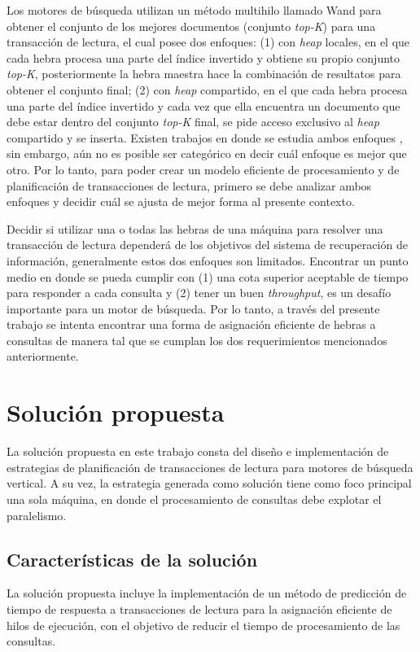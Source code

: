 Los motores de búsqueda utilizan un método multihilo llamado Wand para obtener el conjunto de los mejores documentos (conjunto \textit{top-K}) para una transacción de lectura, el cual posee dos enfoques: (1) con \textit{heap} locales, en el que cada hebra procesa una parte del índice invertido y obtiene su propio conjunto \textit{top-K}, posteriormente la hebra maestra hace la combinación de resultatos para obtener el conjunto final; (2) con \textit{heap} compartido, en el que cada hebra procesa una parte del índice invertido y cada vez que ella encuentra un documento que debe estar dentro del conjunto \textit{top-K} final, se pide acceso exclusivo al \textit{heap} compartido y se inserta. Existen trabajos en donde se estudia ambos enfoques \citep{Rojas:2013}, sin embargo, aún no es posible ser categórico en decir cuál enfoque es mejor que otro. Por lo tanto, para poder crear un modelo eficiente de procesamiento y de planificación de transacciones de lectura, primero se debe analizar ambos enfoques y decidir cuál se ajusta de mejor forma al presente contexto.

Decidir si utilizar una o todas las hebras de una máquina para resolver una transacción de lectura dependerá de los objetivos del sistema de recuperación de información, generalmente estos dos enfoques son limitados. Encontrar un punto medio en donde se pueda cumplir con (1) una cota superior aceptable de tiempo para responder a cada consulta y (2) tener un buen \textit{throughput}, es un desafío importante para un motor de búsqueda. Por lo tanto, a través del presente trabajo se intenta encontrar una forma de asignación eficiente de hebras a consultas de manera tal que se cumplan los dos requerimientos mencionados anteriormente. 


\section{Solución propuesta}
\label{intro:solucionpropuesta}
La solución propuesta en este trabajo consta del diseño e implementación de estrategias de planificación de transacciones de lectura para motores de búsqueda vertical. A su vez, la estrategia generada como solución tiene como foco principal una sola máquina, en donde el procesamiento de consultas debe explotar el paralelismo. 


\subsection{Caracter\'isticas de la solución}
\label{intro:caracteristicassolucion}
La solución propuesta incluye la implementación de un método de predicción de tiempo de respuesta a transacciones de lectura para la asignación eficiente de hilos de ejecución, con el objetivo de reducir el tiempo de procesamiento de las consultas. 

